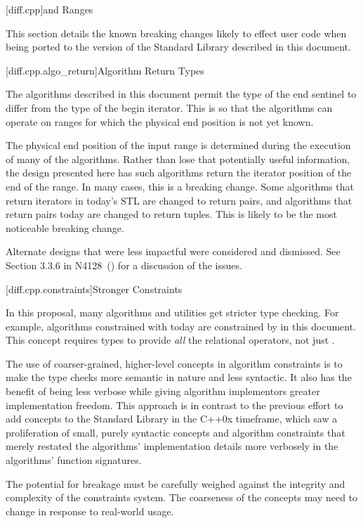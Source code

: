 
[diff.cpp]{\Cpp and Ranges}

\pnum
This section details the known breaking changes likely to effect user code when being ported to the
version of the Standard Library described in this document.

[diff.cpp.algo_return]{Algorithm Return Types}

\pnum
The algorithms described in this document permit the type of the end sentinel to differ from the
type of the begin iterator. This is so that the algorithms can operate on ranges for which the
physical end position is not yet known.

\pnum
The physical end position of the input range is determined during the execution of many of the
algorithms. Rather than lose that potentially useful information, the design presented here has such
algorithms return the iterator position of the end of the range. In many cases, this is a breaking
change. Some algorithms that return iterators in today's STL are changed to return pairs, and
algorithms that return pairs today are changed to return tuples. This is likely to be the most
noticeable breaking change.

\pnum
Alternate designs that were less impactful were considered and dismissed. See Section 3.3.6 in
N4128~(\cite{niebler2014}) for a discussion of the issues.

[diff.cpp.constraints]{Stronger Constraints}

\pnum
In this proposal, many algorithms and utilities get stricter type checking. For example, algorithms
constrained with  today are constrained by  in this
document. This concept requires types to provide \textit{all} the relational operators, not just
.

\pnum
The use of coarser-grained, higher-level concepts in algorithm constraints is to make the type
checks more semantic in nature and less syntactic. It also has the benefit of being less verbose
while giving algorithm implementors greater implementation freedom. This approach is in contrast to
the previous effort to add concepts to the Standard Library in the C++0x timeframe, which saw a
proliferation of small, purely syntactic concepts and algorithm constraints that merely restated the
algorithms' implementation details more verbosely in the algorithms' function signatures.

\pnum
The potential for breakage must be carefully weighed against the integrity and complexity of the
constraints system. The coarseness of the concepts may need to change in response to real-world
usage.

